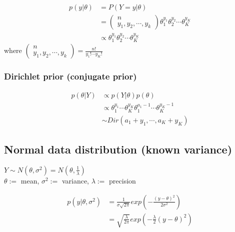    \begin{align*}
        p(y|\theta) &= P(Y=y|\theta)\\
                    &= \begin{pmatrix}
                        n\\
                        y_1, y_2, \cdots, y_k
                    \end{pmatrix}
                    \theta_1^{y_1}\theta_2^{y_2}\cdots
                    \theta_K^{y_K}\\
                    &\propto 
                    \theta_1^{y_1}\theta_2^{y_2}\cdots
                    \theta_K^{y_K}
    \end{align*}
    where $\begin{pmatrix}
        n\\
        y_1, y_2, \cdots, y_k
    \end{pmatrix} = \frac{n!}{y_1!\cdots y_K!}$

    \subsubsection{Dirichlet prior (conjugate prior)}

    \begin{align*}
        p(\theta|Y) &\propto p(Y|\theta)p(\theta) \\
                    &\propto
                    \theta_1^{y_1}\cdots\theta_K^{y_K}
                    \theta_1^{a_1-1}\cdots\theta_K^{y_K-1}\\
                    &\sim Dir(a_1+y_1, \cdots, a_K + y_K)
    \end{align*}

    \subsection{Normal data distribution (known variance)}

    $Y\sim N(\theta, \sigma^2) = N(\theta,
    \frac{1}{\lambda})$\\
    $\theta:=$ mean, $\sigma^2:=$
    variance, $\lambda:=$ precision

    \begin{align*}
        p(y|\theta, \sigma^2) &=
        \frac{1}{\sigma\sqrt{2\pi}}exp\left(-\frac{(y-\theta)^2}{2\sigma^2}\right)\\
                              &=
          \sqrt{ \frac{ \lambda
          }{2\pi}}exp\left(-\frac{\lambda}{2}(y-\theta)^2\right)
      \end{align*}


